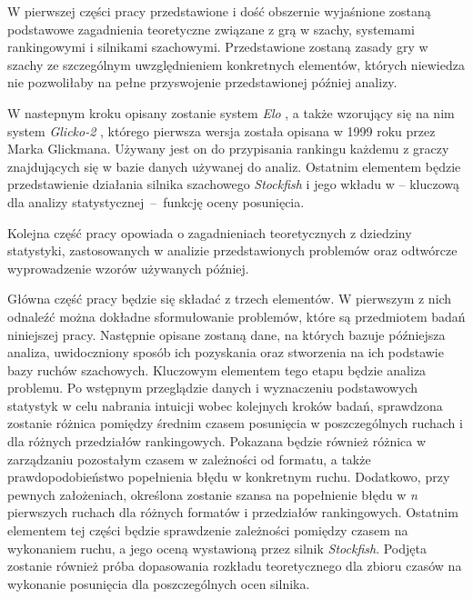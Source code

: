 \documentclass[inzynierska]{pwr_wmat_praca_dyplomowa}
\theoremstyle{plain}
\numberwithin{theorem}{chapter}
\theoremstyle{definition}
\numberwithin{theorem}{chapter}
\begin{document}
W pierwszej części pracy przedstawione i dość obszernie wyjaśnione zostaną podstawowe zagadnienia teoretyczne związane z grą w szachy, systemami rankingowymi i silnikami szachowymi. Przedstawione zostaną zasady gry w szachy ze szczególnym uwzględnieniem konkretnych elementów, których niewiedza nie pozwoliłaby na pełne przyswojenie przedstawionej później analizy.

W nastepnym kroku opisany zostanie system \textit{Elo} \cite{elo}, a także wzorujący się na nim system \textit{Glicko-2} \cite{glicko}, którego pierwsza wersja została opisana w 1999 roku przez Marka Glickmana. Używany jest on  do przypisania rankingu każdemu z graczy znajdujących się w bazie danych używanej do analiz. Ostatnim elementem będzie przedstawienie działania silnika szachowego \textit{Stockfish} i jego wkładu w -- kluczową dla analizy statystycznej~--~funkcję oceny posunięcia.


Kolejna część pracy opowiada o zagadnieniach teoretycznych z dziedziny statystyki, zastosowanych w analizie przedstawionych problemów oraz odtwórcze wyprowadzenie wzorów używanych później. 
 
 
Główna część pracy będzie się składać z trzech elementów. W pierwszym z nich odnaleźć można dokładne sformułowanie problemów, które są przedmiotem badań niniejszej pracy. Następnie opisane zostaną dane, na których bazuje późniejsza analiza,  uwidoczniony sposób ich pozyskania oraz stworzenia na ich podstawie bazy ruchów szachowych. Kluczowym elementem tego etapu będzie analiza problemu. Po wstępnym przeglądzie danych i wyznaczeniu podstawowych statystyk w celu nabrania intuicji wobec kolejnych kroków badań, sprawdzona zostanie różnica pomiędzy średnim czasem posunięcia w poszczególnych ruchach i dla różnych przedziałów rankingowych. Pokazana będzie również różnica w zarządzaniu pozostałym czasem w zależności od formatu, a także prawdopodobieństwo popełnienia błędu w konkretnym ruchu. Dodatkowo, przy pewnych założeniach, określona zostanie szansa na popełnienie błędu w \textit{n} pierwszych ruchach dla różnych formatów i przedziałów rankingowych. Ostatnim elementem tej części będzie sprawdzenie zależności pomiędzy czasem na wykonaniem ruchu, a jego oceną wystawioną przez silnik \textit{Stockfish}. Podjęta zostanie również próba dopasowania rozkładu teoretycznego dla zbioru czasów na wykonanie posunięcia dla poszczególnych ocen silnika.
\end{document}

